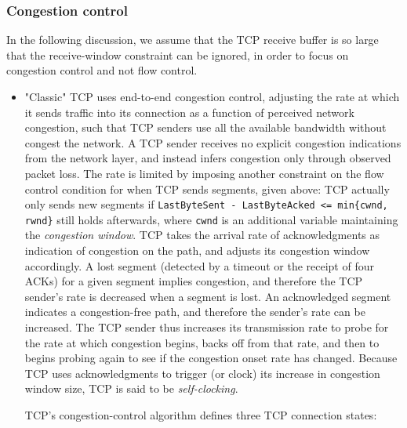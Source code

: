 \documentclass[8pt, table, xcdraw]{article}%
\begin{document}
\subsubsection{Congestion control}

In the following discussion, we assume that the TCP receive buffer is so large that the receive-window constraint can be ignored, in order to focus on congestion control and not flow control.

\begin{itemize}
    \item "Classic" TCP uses end-to-end congestion control, adjusting the rate at which it sends traffic into its connection as a function of perceived network congestion, such that TCP senders use all the available bandwidth without congest the network. A TCP sender receives no explicit congestion indications from the network layer, and instead infers congestion only through observed packet loss. The rate is limited by imposing another constraint on the flow control condition for when TCP sends segments, given above: TCP actually only sends new segments if \lstinline|LastByteSent - LastByteAcked <= min{cwnd, rwnd}| still holds afterwards, where \lstinline{cwnd} is an additional variable maintaining the \emph{congestion window}. TCP takes the arrival rate of acknowledgments as indication of congestion on the path, and adjusts its congestion window accordingly. A lost segment (detected by a timeout or the receipt of four ACKs) for a given segment implies congestion, and therefore the TCP sender’s rate is decreased when a segment is lost. An acknowledged segment indicates a congestion-free path, and therefore the sender’s rate can be increased. The TCP sender thus increases its transmission rate to probe for the rate at which congestion begins, backs off from that rate, and then to begins probing again to see if the congestion onset rate has changed. Because TCP uses acknowledgments to trigger (or clock) its increase in congestion window size, TCP is said to be \emph{self-clocking}.

    TCP's congestion-control algorithm defines three TCP connection states:
    

\end{itemize}
\end{document}

